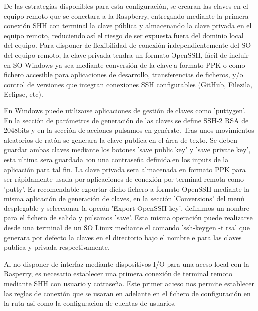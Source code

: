  De las estrategias disponibles para esta configuración, se crearan las claves en el equipo remoto que se conectara a la Raspberry, entregando mediante la primera conexión SHH con terminal la clave pública y almacenando la clave privada en el equipo remoto, reduciendo así el riesgo de ser expuesta fuera del dominio local del equipo. Para disponer de flexibilidad de conexión independientemente del SO del equipo remoto, la clave privada tendra un formato OpenSSH, fácil de incluir en SO Windows ya sea mediante conversión de la clave a formato PPK o como fichero accesible para aplicaciones de desarrollo, transferencias de ficheros, y/o control de versiones que integran conexiones SSH configurables (GitHub, Filezila, Eclipse, etc).

En Windows puede utilizarse aplicaciones de gestión de claves como 'puttygen'. En la sección de parámetros de generación de las claves se define SSH-2 RSA de 2048bits y en la sección de acciones pulsamos en genérate. Tras unos movimientos aleatorios de ratón se generara la clave publica en el área de texto. Se deben guardar ambas claves mediante los botones 'save public key' y 'save private key', esta ultima sera guardada con una contraseña definida en los inputs de la aplicación para tal fin. La clave privada sera almacenada en formato PPK para ser rápidamente usada por aplicaciones de conexión por terminal remota como 'putty'. Es recomendable exportar dicho fichero a formato OpenSSH mediante la misma aplicación de generación de claves, en la sección 'Conversions' del menú desplegable y seleccionar la opción 'Export OpenSSH key', definimos  un nombre para el fichero de salida y pulsamos 'save'. Esta misma operación puede realizarse desde una terminal de un SO Linux mediante el comando 'ssh-keygen -t rsa' que generara por defecto la claves en el directorio  bajo el nombre  e  para las claves publica y privada respectivamente.

Al no disponer de interfaz mediante dispositivos I/O para una aceso local con la Rasperry, es necesario establecer una primera conexión de terminal remoto mediante SHH con usuario y cotraseña. Este primer acceso nos permite establecer las reglas de conexión que se usaran en adelante en el fichero de configuración en la ruta  asi como la configuracion de cuentas de usuarios.

